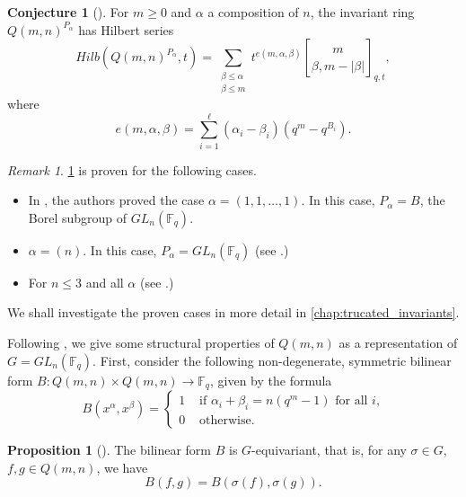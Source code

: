 \documentclass[12pt,a4paper]{report}
\theoremstyle{definition}
\newtheorem{proposition}[theorem]{Proposition}
\newtheorem{conjecture}[theorem]{Conjecture}
\theoremstyle{remark}
\newtheorem*{remark}{Remark}
\theoremstyle{definition}
\begin{document}
\begin{conjecture}[{\cite[Parabolic conjecture 1.5]{Lewis_Reiner_Stanton_2017}}]\label{conj:parabolic_conj}
    For $m\geq 0$ and $\alpha$ a composition of $n$, the invariant ring $Q(m, n)^{P_{\alpha}}$ has Hilbert series
    \begin{equation*}
        Hilb(Q(m, n)^{P_{\alpha}}, t) = \sum\limits_{\substack{\beta\leq \alpha\\ \beta\leq m}}t^{e(m, \alpha, \beta)}\genfrac{[}{]}{0pt}{}{m}{\beta, m-|\beta|}_{q, t},
    \end{equation*}
    where 
    \begin{equation*}
        e(m, \alpha, \beta) = \sum\limits_{i=1}^{\ell}(\alpha_i - \beta_i)(q^m-q^{B_i}).
    \end{equation*}
\end{conjecture}
\begin{remark}
    \cref{conj:parabolic_conj} is proven for the following cases.
    \begin{itemize}
        \item[(1)] In \cite{Ha_Hai_Nghia_2024}, the authors proved the case $\alpha = (1, 1, \ldots, 1)$. In this case, $P_{\alpha} = B$, the Borel subgroup of $GL_n(\mathbb{F}_q)$. 
        \item[(2)] $\alpha = (n)$. In this case, $P_{\alpha} = GL_n(\mathbb{F}_q)$ (see \cite{ha_hai_nghia_GL}.)
        \item[(3)] For $n\leq 3$ and all $\alpha$ (see \cite{ha_hai_nghia_parabolic_for_low_rank}.)
    \end{itemize}
    We shall investigate the proven cases in more detail in \cref{chap:trucated_invariants}. 
\end{remark}
Following \cite{Lewis_Reiner_Stanton_2017}, we give some structural properties of $Q(m, n)$ as a representation of $G = GL_n(\mathbb{F}_q)$. First, consider the following non-degenerate, symmetric bilinear form $B: Q(m, n)\times Q(m, n) \to \mathbb{F}_q$, given by the formula
\begin{equation*}
    B(x^{\alpha}, x^{\beta}) = \begin{cases}
        1 & \text{ if $\alpha_i + \beta_i = n(q^m-1)$ for all $i$,}\\
        0 & \text{ otherwise}.
    \end{cases}
\end{equation*}
\begin{proposition}[{\cite[Proposition 3.1]{Lewis_Reiner_Stanton_2017}}]
    The bilinear form $B$ is $G$-equivariant, that is, for any $\sigma\in G$, $f, g\in Q(m, n)$, we have
    \begin{equation*}
        B(f, g) = B(\sigma(f), \sigma(g)).
    \end{equation*}
\end{proposition}
\end{document}
